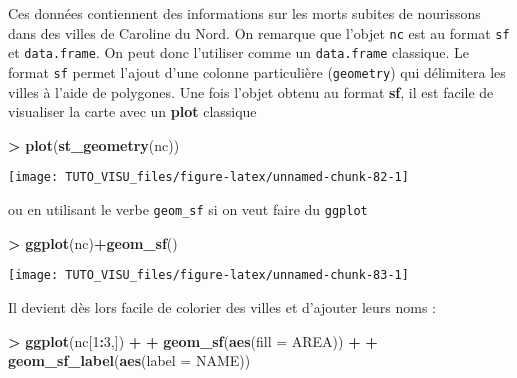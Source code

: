 \documentclass[]{article}
\newenvironment{Shaded}{\begin{snugshade}}{\end{snugshade}}
\newcommand{\DataTypeTok}[1]{\textcolor[rgb]{0.13,0.29,0.53}{#1}}
\newcommand{\DecValTok}[1]{\textcolor[rgb]{0.00,0.00,0.81}{#1}}
\newcommand{\KeywordTok}[1]{\textcolor[rgb]{0.13,0.29,0.53}{\textbf{#1}}}
\newcommand{\NormalTok}[1]{#1}
\newcommand{\OperatorTok}[1]{\textcolor[rgb]{0.81,0.36,0.00}{\textbf{#1}}}
\newcommand{\StringTok}[1]{\textcolor[rgb]{0.31,0.60,0.02}{#1}}
\theoremstyle{definition}
\theoremstyle{definition}
\theoremstyle{definition}
\theoremstyle{remark}
\begin{document}
Ces données contiennent des informations sur les morts subites de nourissons dans des villes de Caroline du Nord. On remarque que l'objet \texttt{nc} est au format \texttt{sf} et \texttt{data.frame}. On peut donc l'utiliser comme un \texttt{data.frame} classique. Le format \texttt{sf} permet l'ajout d'une colonne particulière (\texttt{geometry}) qui délimitera les villes à l'aide de polygones. Une fois l'objet obtenu au format \textbf{sf}, il est facile de visualiser la carte avec un \textbf{plot} classique

\begin{Shaded}
\begin{Highlighting}[]
\OperatorTok{>}\StringTok{ }\KeywordTok{plot}\NormalTok{(}\KeywordTok{st_geometry}\NormalTok{(nc))}
\end{Highlighting}
\end{Shaded}

\begin{center}\texttt{[image: TUTO\_VISU\_files/figure-latex/unnamed-chunk-82-1]} \end{center}

ou en utilisant le verbe \texttt{geom\_sf} si on veut faire du \texttt{ggplot}

\begin{Shaded}
\begin{Highlighting}[]
\OperatorTok{>}\StringTok{ }\KeywordTok{ggplot}\NormalTok{(nc)}\OperatorTok{+}\KeywordTok{geom_sf}\NormalTok{()}
\end{Highlighting}
\end{Shaded}

\begin{center}\texttt{[image: TUTO\_VISU\_files/figure-latex/unnamed-chunk-83-1]} \end{center}

Il devient dès lors facile de colorier des villes et d'ajouter leurs noms :

\begin{Shaded}
\begin{Highlighting}[]
\OperatorTok{>}\StringTok{ }\KeywordTok{ggplot}\NormalTok{(nc[}\DecValTok{1}\OperatorTok{:}\DecValTok{3}\NormalTok{,]) }\OperatorTok{+}
\OperatorTok{+}\StringTok{    }\KeywordTok{geom_sf}\NormalTok{(}\KeywordTok{aes}\NormalTok{(}\DataTypeTok{fill =}\NormalTok{ AREA)) }\OperatorTok{+}\StringTok{ }
\OperatorTok{+}\StringTok{    }\KeywordTok{geom_sf_label}\NormalTok{(}\KeywordTok{aes}\NormalTok{(}\DataTypeTok{label =}\NormalTok{ NAME))}
\end{Highlighting}
\end{Shaded}
\end{document}
